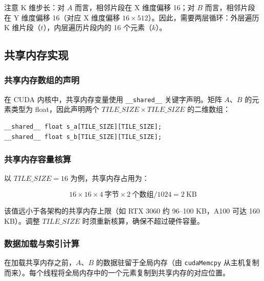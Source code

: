注意 K 维步长：对 $A$ 而言，相邻片段在 X 维度偏移 16；对 $B$ 而言，相邻片段在 Y 维度偏移 16（对应 X 维度偏移 $16 \times 512$）。因此，需要两层循环：外层遍历 K 维片段（$t$），内层遍历片段内的 16 个元素（$k$）。

\subsection{共享内存实现}

\subsubsection{共享内存数组的声明}

在 CUDA 内核中，共享内存变量使用 \texttt{\_\_shared\_\_} 关键字声明。矩阵 $A$、$B$ 的元素类型为 float，因此声明两个 $TILE\_SIZE \times TILE\_SIZE$ 的二维数组：

\begin{lstlisting}
__shared__ float s_a[TILE_SIZE][TILE_SIZE];
__shared__ float s_b[TILE_SIZE][TILE_SIZE];
\end{lstlisting}

\subsubsection{共享内存容量核算}

以 $TILE\_SIZE = 16$ 为例，共享内存占用为：

\[
16 \times 16 \times 4\ \text{字节} \times 2\ \text{个数组} / 1024 = 2\ \text{KB}
\]

该值远小于各架构的共享内存上限（如 RTX 3060 约 96--100 KB，A100 可达 160 KB）。调整 $TILE\_SIZE$ 时须重新核算，确保不超过硬件容量。

\subsubsection{数据加载与索引计算}

在加载共享内存之前，$A$、$B$ 的数据驻留于全局内存（由 \texttt{cudaMemcpy} 从主机复制而来）。每个线程将全局内存中的一个元素复制到共享内存的对应位置。

